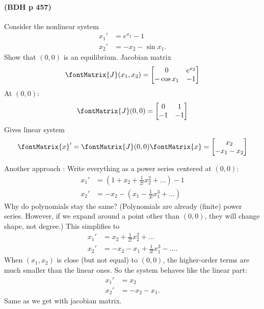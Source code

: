 \paragraph{(BDH p 457)} Consider the nonlinear system
\begin{align*}
x_{1}'
&=
e^{x_{2}} - 1
\\
x_{2}'
&=
-x_{2} - \sin x_{1}.
\end{align*}
Show that $(0,0)$ is an equilibrium. Jacobian matrix
\begin{align*}
\fontMatrix{J}(x_{1},x_{2})
=
\begin{bmatrix}
0			&	e^{x_{2}}	\\
-\cos x_{1}	&	-1
\end{bmatrix}
\end{align*}
At $(0,0)$:
\begin{align*}
\fontMatrix{J}(0,0)
=
\begin{bmatrix}
0	&	1	\\
-1	&	-1
\end{bmatrix}
\end{align*}
Gives linear system
\begin{align*}
\fontMatrix{x}'
=
\fontMatrix{J}(0,0) \fontMatrix{x}
=
\begin{bmatrix}
x_{2}			\\
-x_{1} - x_{2}
\end{bmatrix}
\end{align*}

Another approach : Write everything as a power series centered at $(0,0)$:
\begin{align*}
x_{1}'
&=
\left(1 + x_{2} + \frac{1}{2!} x_{2}^{2} + \ldots\right) - 1
\\
x_{2}'
&=
-x_{2} - \left(x_{1} - \frac{1}{3!} x_{1}^{3} + \ldots\right)
\end{align*}
Why do polynomials stay the same? (Polynomials are already (finite) power series. However, if we expand around a point other than $(0,0)$, they will change shape, not degree.) This simplifies to
\begin{align*}
x_{1}'
&=
x_{2} + \frac{1}{2!} x_{2}^{2} + \ldots
\\
x_{2}'
&=
-x_{2} - x_{1} + \frac{1}{3!} x_{1}^{3} - \ldots.
\end{align*}
When $(x_{1},x_{2})$ is close (but not equal) to $(0,0)$, the higher-order terms are much smaller than the linear ones. So the system behaves like the linear part:
\begin{align*}
x_{1}'
&=
x_{2}
\\
x_{2}'
&=
-x_{2} - x_{1}.
\end{align*}
Same as we get with jacobian matrix.

